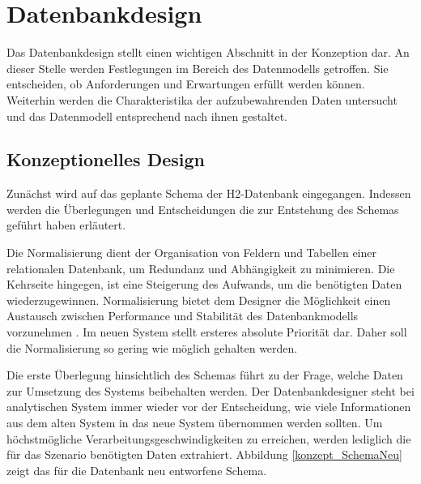 \section{Datenbankdesign}

Das Datenbankdesign stellt einen wichtigen Abschnitt in der Konzeption dar. An dieser Stelle werden Festlegungen im Bereich des Datenmodells getroffen. Sie entscheiden, ob Anforderungen und Erwartungen erfüllt werden können. Weiterhin werden die Charakteristika der aufzubewahrenden Daten untersucht und das Datenmodell entsprechend nach ihnen gestaltet.

\subsection{Konzeptionelles Design}

Zunächst wird auf das geplante Schema der H2-Datenbank eingegangen. Indessen werden die Überlegungen und Entscheidungen die zur Entstehung des Schemas geführt haben erläutert. 

Die Normalisierung dient der Organisation von Feldern und Tabellen einer relationalen Datenbank, um Redundanz und Abhängigkeit zu minimieren. Die Kehrseite hingegen, ist eine Steigerung des Aufwands, um die benötigten Daten wiederzugewinnen. Normalisierung bietet dem Designer die Möglichkeit einen Austausch zwischen Performance und Stabilität des Datenbankmodells vorzunehmen \cite{geisler2011datenbanken}. Im neuen System stellt ersteres absolute Priorität dar. Daher soll die Normalisierung so gering wie möglich gehalten werden. 

Die erste Überlegung hinsichtlich des Schemas führt zu der Frage, welche Daten zur Umsetzung des Systems beibehalten werden. Der Datenbankdesigner steht bei analytischen System immer wieder vor der Entscheidung, wie viele Informationen aus dem alten System in das neue System übernommen werden sollten. Um höchstmögliche Verarbeitungsgeschwindigkeiten zu erreichen, werden lediglich die für das Szenario benötigten Daten extrahiert. Abbildung \ref{konzept_SchemaNeu} zeigt das für die Datenbank neu entworfene Schema. 

